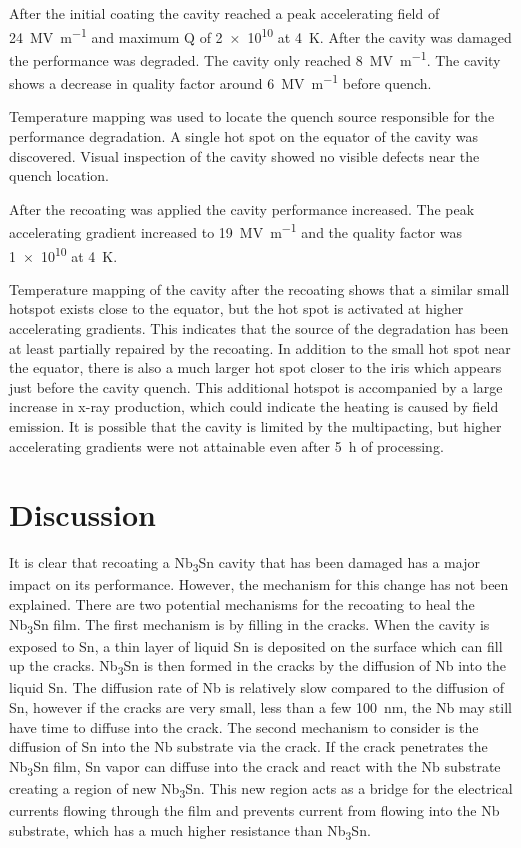 \documentclass{revtex4-2}
\begin{document}
After the initial coating the cavity reached a peak accelerating field of \qty{24}{\mega\volt\per\meter} and maximum Q of \num{2e10} at \qty{4}{\kelvin}. After the cavity was damaged the performance was degraded. The cavity only reached \qty{8}{\mega\volt\per\meter}. The cavity shows a decrease in quality factor around \qty{6}{\mega\volt\per\meter} before quench.

Temperature mapping was used to locate the quench source responsible for the performance degradation. A single hot spot on the equator of the cavity was discovered. Visual inspection of the cavity showed no visible defects near the quench location.

After the recoating was applied the cavity performance increased. The peak accelerating gradient increased to \qty{19}{\mega\volt\per\meter} and the quality factor was \num{1e10} at \qty{4}{\kelvin}.

Temperature mapping of the cavity after the recoating shows that a similar small hotspot exists close to the equator, but the hot spot is activated at higher accelerating gradients. This indicates that the source of the degradation has been at least partially repaired by the recoating. In addition to the small hot spot near the equator, there is also a much larger hot spot closer to the iris which appears just before the cavity quench. This additional hotspot is accompanied by a large increase in x-ray production, which could indicate the heating is caused by field emission. It is possible that the cavity is limited by the multipacting, but higher accelerating gradients were not attainable even after \qty{5}{\hour} of processing.



\section*{Discussion}
\label{sec:Discussion}

It is clear that recoating a Nb\textsubscript{3}Sn cavity that has been damaged has a major impact on its performance. However, the mechanism for this change has not been explained. There are two potential mechanisms for the recoating to heal the Nb\textsubscript{3}Sn film. The first mechanism is by filling in the cracks. When the cavity is exposed to Sn, a thin layer of liquid Sn is deposited on the surface which can fill up the cracks. Nb\textsubscript{3}Sn is then formed in the cracks by the diffusion of Nb into the liquid Sn. The diffusion rate of Nb is relatively slow compared to the diffusion of Sn, however if the cracks are very small, less than a few \qty{100}{nm}, the Nb may still have time to diffuse into the crack. The second mechanism to consider is the diffusion of Sn into the Nb substrate via the crack. If the crack penetrates the Nb\textsubscript{3}Sn film, Sn vapor can diffuse into the crack and react with the Nb substrate creating a region of new Nb\textsubscript{3}Sn. This new region acts as a bridge for the electrical currents flowing through the film and prevents current from flowing into the Nb substrate, which has a much higher resistance than Nb\textsubscript{3}Sn. 
\end{document}
